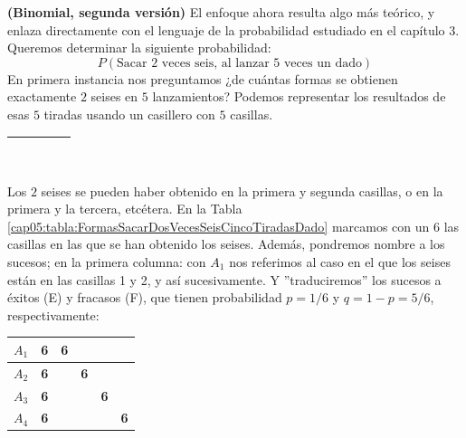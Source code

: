 \begin{Ejemplo}{\bf (Binomial, segunda versión)}\label{ejem:BinomialDosSeisesCuatroTiradasMarcos} El enfoque ahora
resulta algo más teórico, y enlaza directamente con el lenguaje de la probabilidad estudiado en el capítulo 3.
Queremos determinar la siguiente probabilidad:
            	\[P(\text{Sacar $2$ veces seis, al lanzar $5$ veces un dado})\]
            En primera instancia nos preguntamos ¿de cuántas formas se obtienen exactamente $2$ seises en $5$ lanzamientos? %
             Podemos representar los resultados de esas $5$ tiradas usando un casillero con $5$  casillas.
            \begin{center}
            \begin{tabular}{|c|c|c|c|c|}
            \hline
             \rule{0cm}{0.5cm}\rule{0.3cm}{0cm}&\rule{0.3cm}{0cm}&\rule{0.3cm}{0cm} &\rule{0.3cm}{0cm}
             &\rule{0.3cm}{0cm}\\
             \hline
             \end{tabular}
             \end{center}
             Los $2$ seises se pueden haber obtenido en la primera y segunda casillas, o en la primera y la tercera, etcétera.
    En la Tabla \ref{cap05:tabla:FormasSacarDosVecesSeisCincoTiradasDado} marcamos con un $6$ las casillas en las que se han obtenido los seises. Adem\'as, pondremos nombre a los sucesos; en la primera columna: con $A_1$ nos referimos al caso en el que los seises están en las casillas 1 y 2, y así sucesivamente. Y  ''traduciremos'' los sucesos a \'exitos (E) y fracasos (F), que tienen probabilidad $p=1/6$ y $q=1-p=5/6$, respectivamente:
    \begin{table}[htbp]
        \begin{center}
          \begin{tabular}{|c|c|c|c|c|c|}
            \hline
            $A_1$ &  \rule{0cm}{0.5cm}\mbox{\large\bf 6}&\mbox{\large\bf 6}& & & \\
            \hline
            $A_2$ &  \rule{0cm}{0.5cm}\mbox{\large\bf 6}&& \mbox{\large\bf 6}& & \\
            \hline
            $A_3$ &  \rule{0cm}{0.5cm}\mbox{\large\bf 6}&& &\mbox{\large\bf 6} & \\
            \hline
            $A_4$ &  \rule{0cm}{0.5cm}\mbox{\large\bf 6}&& & &\mbox{\large\bf 6} \\

\end{tabular}
\end{center}
\end{table}
\end{Ejemplo}
